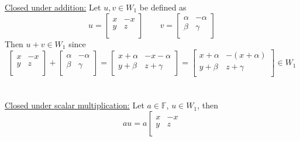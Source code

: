 \documentclass[12pt]{article}
\newcommand{\F}{\mathbb{F}}
\begin{document}
\begin{enumerate}
\begin{enumerate}
\begin{mybox}
            \noindent \underline{Closed under addition:} Let $u, v \in W_1$ be defined as
            $$u = \left[
              \begin{array}{cc}
                x & -x \\
                y & z \\
              \end{array}
            \right] \qquad v = \left[
              \begin{array}{cc}
                \alpha & -\alpha \\
                \beta & \gamma \\
              \end{array}
            \right]$$
            Then $u + v \in W_1$ since
            $$\left[
              \begin{array}{cc}
                x & -x \\
                y & z \\
              \end{array}
            \right] + \left[
              \begin{array}{cc}
                \alpha & -\alpha \\
                \beta & \gamma \\
              \end{array}
            \right] = 
            \left[
              \begin{array}{cc}
                x + \alpha & -x-\alpha \\
                y+\beta & z+\gamma \\
              \end{array}
            \right] = 
            \left[
              \begin{array}{cc}
                x + \alpha & -(x+\alpha) \\
                y+\beta & z+\gamma \\
              \end{array}
            \right] \in W_1
            $$
            \\\vspace{0.1in}\\
            \underline{Closed under scalar multiplication:} Let $a \in \F$, $u \in W_1$, then
            $$au = a \left[
              \begin{array}{cc}
                x & -x \\
                y & z \\
              \end{array}
$$
\end{mybox}
\end{enumerate}
\end{enumerate}
\end{document}
